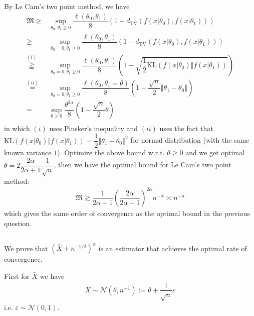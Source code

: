 \documentclass[11pt,a4paper]{ctexart}
\numberwithin{equation}{section}%
\begin{document}
By Le Cam's two point method, we have
\begin{align*}
    \mathfrak{M}\geq& \mathop{ \sup }\limits_{\theta _0,\theta _1\geq 0} \dfrac{ \ell(\theta _0,\theta _1) }{ 8 }(1-d_\mathrm{ TV }(f(x|\theta _0), f(x|\theta _1)) ) \\
    \geq &  \mathop{ \sup }\limits_{\theta _0=0, \theta _1\geq 0} \dfrac{ \ell(\theta _0,\theta _1) }{ 8 }(1-d_\mathrm{ TV }(f(x|\theta _0), f(x|\theta _1)) ) \\
    \mathop{ \geqq }\limits^{(i)}  & \mathop{ \sup }\limits_{\theta _0=0, \theta _1\geq 0} \dfrac{ \ell(\theta _0,\theta _1) }{ 8 }(1-\sqrt{\dfrac{ 1 }{ 2 } \mathrm{ KL }(f(x|\theta _0)\Vert f(x|\theta _1)) }) \\ 
    \mathop{ = }\limits^{(ii)}& \mathop{ \sup }\limits_{\theta _0=0, \theta _1\geq 0} \dfrac{ \ell(\theta _0,\theta _1=\theta ) }{ 8 }(1-\dfrac{ \sqrt{n} }{ 2 }\left\Vert \theta _1-\theta _0 \right\Vert  ) \\
    =&\mathop{ \sup }\limits_{\theta \geq 0} \dfrac{ \theta ^{2\alpha } }{ 8 }\left( 1 - \dfrac{ \sqrt{n} }{ 2 }\theta  \right)\\ 
\end{align*}
in which $ (i) $ uses Pinsker's inequality and $ (ii) $ uses the fact that $ \mathrm{KL}(f(x|\theta _0)\Vert f(x|\theta _1)) = \dfrac{ 1 }{ 2 } \left\Vert \theta _1-\theta _0 \right\Vert ^2 $ for normal distribution (with the same known variance $ 1 $). Optimize the above bound w.r.t. $ \theta \geq 0 $ and we get optimal $ \theta = 2\dfrac{ 2\alpha  }{ 2\alpha +1 } \dfrac{ 1 }{ \sqrt{n} }  $, then we have the optimal bound for Le Cam's two point method:
\begin{align*}
    \mathfrak{M}\gtrsim \dfrac{ 1 }{ 2\alpha +1 } \left(\dfrac{ 2\alpha  }{ 2\alpha +1 } \right)^{2\alpha } n^{-\alpha }\asymp n^{-\alpha } 
\end{align*}
which gives the same order of convergence as the optimal bound in the previous question.


\subsection{}

We prove that $ (\bar{X}+n^{-1/2})^\alpha $ is an estimator that achieves the optimal rate of convergence. 

First for $ \bar{X} $ we have
\begin{align*}
    \bar{X} \sim \mathcal{N}(\theta ,n^{-1}):= \theta + \dfrac{ 1 }{ \sqrt{n} } \varepsilon  
\end{align*}
i.e. $ \varepsilon \sim \mathcal{N}(0,1) $.
\end{document}
